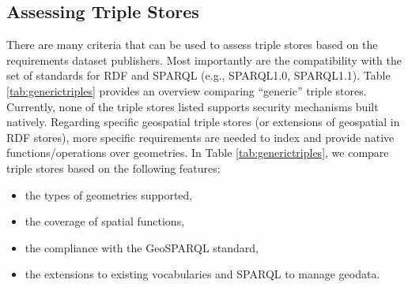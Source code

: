 
\subsection{Assessing Triple Stores }
There are many criteria that can be used to assess triple stores based on the requirements dataset publishers. Most importantly are the compatibility with the set of standards for RDF and SPARQL (e.g., SPARQL1.0, SPARQL1.1). Table \ref{tab:generictriples} provides an overview comparing ``generic'' triple stores. Currently, none of the triple stores listed supports security mechanisms built natively. Regarding specific geospatial triple stores (or extensions of geospatial in RDF stores), more specific requirements are needed to index and provide native functions/operations over geometries. In Table \ref{tab:generictriples}, we compare triple stores based on the following features:

\begin{itemize}
\item the types of geometries supported,
\item the coverage of spatial functions,
\item the compliance with the GeoSPARQL standard,
\item the extensions to existing vocabularies and SPARQL to manage geodata.
\end{itemize}

